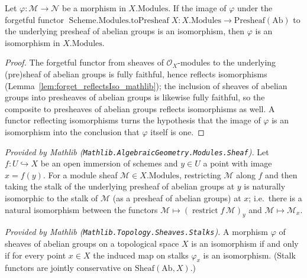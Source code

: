 \begin{lemma}

  \label{lem:isIso_modules_of_toPresheaf}
  Let \(\varphi : \mathcal{M} \to \mathcal{N}\) be a morphism in \(X.\mathrm{Modules}\). If the
  image of \(\varphi\) under the forgetful functor
  \(\operatorname{Scheme.Modules.toPresheaf} X : X.\mathrm{Modules} \to \mathrm{Presheaf}(\mathrm{Ab})\)
  to the underlying presheaf of abelian groups is an isomorphism, then \(\varphi\) is an
  isomorphism in \(X.\mathrm{Modules}\).
\end{lemma}
\begin{proof}
  The forgetful functor from sheaves of \(\mathcal{O}_X\)-modules to the underlying (pre)sheaf of
  abelian groups is fully faithful, hence reflects isomorphisms
  (Lemma~\ref{lem:forget_reflectsIso_mathlib}); the inclusion of sheaves of abelian groups into
  presheaves of abelian groups is likewise fully faithful, so the composite to presheaves of abelian
  groups reflects isomorphisms as well. A functor reflecting isomorphisms turns the hypothesis that
  the image of \(\varphi\) is an isomorphism into the conclusion that \(\varphi\) itself is one.
\end{proof}

\begin{lemma}
  \label{lem:restrictStalkNatIso_mathlib}
  \mathlibok
  \textit{Provided by Mathlib
  (\texttt{Mathlib.AlgebraicGeometry.Modules.Sheaf}).}
  Let \(f : U \hookrightarrow X\) be an open immersion of schemes and \(y \in U\) a point with
  image \(x = f(y)\). For a module sheaf \(\mathcal{M} \in X.\mathrm{Modules}\), restricting
  \(\mathcal{M}\) along \(f\) and then taking the stalk of the underlying presheaf of abelian
  groups at \(y\) is naturally isomorphic to the stalk of \(\mathcal{M}\) (as a presheaf of
  abelian groups) at \(x\); i.e.\ there is a natural isomorphism between the functors
  \(\mathcal{M} \mapsto (\operatorname{restrict} f\,\mathcal{M})_y\) and \(\mathcal{M} \mapsto
  \mathcal{M}_x\).
\end{lemma}

\begin{lemma}
  \label{lem:isIso_iff_stalkFunctor_map_iso_mathlib}
  \mathlibok
  \textit{Provided by Mathlib
  (\texttt{Mathlib.Topology.Sheaves.Stalks}).}
  A morphism \(\varphi\) of sheaves of abelian groups on a topological space \(X\) is an
  isomorphism if and only if for every point \(x \in X\) the induced map on stalks
  \(\varphi_x\) is an isomorphism. (Stalk functors are jointly conservative on
  \(\mathrm{Sheaf}(\mathrm{Ab}, X)\).)
\end{lemma}

